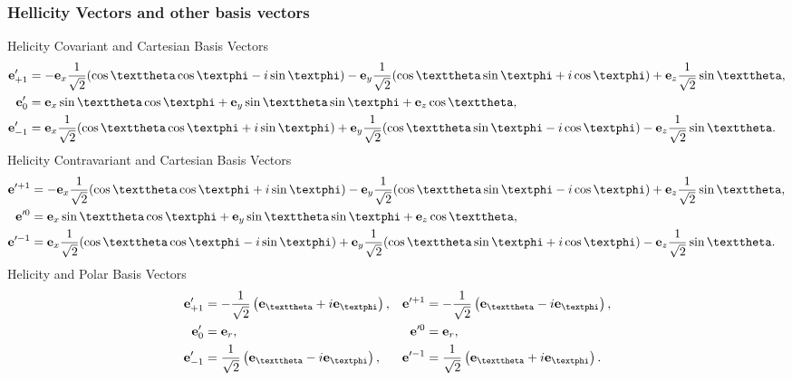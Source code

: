 \subsubsection{Hellicity Vectors and other basis vectors}
 Helicity Covariant and Cartesian Basis Vectors
\begin{align}
\vect{e}_{+1}^{\prime} & =-\vect{e}_{x} \frac{1}{\sqrt{2}}(\cos \vartheta \cos \varphi-i \sin \varphi)-\vect{e}_{y} \frac{1}{\sqrt{2}}(\cos \vartheta \sin \varphi+i \cos \varphi)+\vect{e}_{z} \frac{1}{\sqrt{2}} \sin \vartheta , \notag\\
\vect{e}_{0}^{\prime} & =\vect{e}_{x} \sin \vartheta \cos \varphi+\vect{e}_{y} \sin \vartheta \sin \varphi+\vect{e}_{z} \cos \vartheta , \label{eq:1:1:46}\\
\vect{e}_{-1}^{\prime} & =\vect{e}_{x} \frac{1}{\sqrt{2}}(\cos \vartheta \cos \varphi+i \sin \varphi)+\vect{e}_{y} \frac{1}{\sqrt{2}}(\cos \vartheta \sin \varphi-i \cos \varphi)-\vect{e}_{z} \frac{1}{\sqrt{2}} \sin \vartheta. \notag
\end{align}
Helicity Contravariant and Cartesian Basis Vectors
\begin{align}
\vect{e}^{\prime+1} & =-\vect{e}_{x} \frac{1}{\sqrt{2}}(\cos \vartheta \cos \varphi+i \sin \varphi)-\vect{e}_{y} \frac{1}{\sqrt{2}}(\cos \vartheta \sin \varphi-i \cos \varphi)+\vect{e}_{z} \frac{1}{\sqrt{2}} \sin \vartheta  ,\notag\\
\vect{e}^{\prime 0} & =\vect{e}_{x} \sin \vartheta \cos \varphi+\vect{e}_{y} \sin \vartheta \sin \varphi+\vect{e}_{z} \cos \vartheta  ,\label{eq:1:1:47}\\
\vect{e}^{\prime-1} & =\vect{e}_{x} \frac{1}{\sqrt{2}}(\cos \vartheta \cos \varphi-i \sin \varphi)+\vect{e}_{y} \frac{1}{\sqrt{2}}(\cos \vartheta \sin \varphi+i \cos \varphi)-\vect{e}_{z} \frac{1}{\sqrt{2}} \sin \vartheta .\notag
\end{align}
Helicity and Polar Basis Vectors
\begin{align}
\vect{e}_{+1}^{\prime} & =-\frac{1}{\sqrt{2}}\left(\vect{e}_{\vartheta}+i \vect{e}_{\varphi}\right), & \vect{e}^{\prime+1} & =-\frac{1}{\sqrt{2}}\left(\vect{e}_{\vartheta}-i \vect{e}_{\varphi}\right),  \notag\\
\vect{e}_{0}^{\prime} & =\vect{e}_{r}, & \vect{e}^{\prime 0} & =\vect{e}_{r},  \label{eq:1:1:48}\\
\vect{e}_{-1}^{\prime} & =\frac{1}{\sqrt{2}}\left(\vect{e}_{\vartheta}-i \vect{e}_{\varphi}\right), & \vect{e}^{\prime-1} & =\frac{1}{\sqrt{2}}\left(\vect{e}_{\vartheta}+i \vect{e}_{\varphi}\right) . \notag
\end{align}
